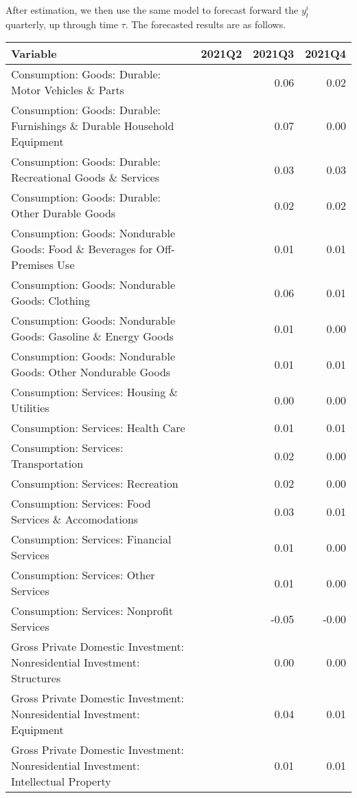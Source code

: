 \documentclass[11pt, letterpaper]{article}\usepackage[]{graphicx}\usepackage[]{color}
\begin{document}
After estimation, we then use the same model to forecast forward the $y^i_t$ quarterly, up through time $\tau$. 
The forecasted results are as follows.
\begin{table}[H]
\centering
\begingroup\scriptsize
\begin{tabular}{lrrr}
  \hline
Variable & 2021Q2 & 2021Q3 & 2021Q4 \\ 
  \hline
Consumption: Goods: Durable: Motor Vehicles \& Parts &  & 0.06 & 0.02 \\ 
  Consumption: Goods: Durable: Furnishings \& Durable Household Equipment &  & 0.07 & 0.00 \\ 
  Consumption: Goods: Durable: Recreational Goods \& Services &  & 0.03 & 0.03 \\ 
  Consumption: Goods: Durable: Other Durable Goods &  & 0.02 & 0.02 \\ 
  Consumption: Goods: Nondurable Goods: Food \& Beverages for Off-Premises Use &  & 0.01 & 0.01 \\ 
  Consumption: Goods: Nondurable Goods: Clothing &  & 0.06 & 0.01 \\ 
  Consumption: Goods: Nondurable Goods: Gasoline \& Energy Goods &  & 0.01 & 0.00 \\ 
  Consumption: Goods: Nondurable Goods: Other Nondurable Goods &  & 0.01 & 0.01 \\ 
  Consumption: Services: Housing \& Utilities &  & 0.00 & 0.00 \\ 
  Consumption: Services: Health Care &  & 0.01 & 0.01 \\ 
  Consumption: Services: Transportation &  & 0.02 & 0.00 \\ 
  Consumption: Services: Recreation &  & 0.02 & 0.00 \\ 
  Consumption: Services: Food Services \& Accomodations &  & 0.03 & 0.01 \\ 
  Consumption: Services: Financial Services &  & 0.01 & 0.00 \\ 
  Consumption: Services: Other Services &  & 0.01 & 0.00 \\ 
  Consumption: Services: Nonprofit Services &  & -0.05 & -0.00 \\ 
  Gross Private Domestic Investment: Nonresidential Investment: Structures &  & 0.00 & 0.00 \\ 
  Gross Private Domestic Investment: Nonresidential Investment: Equipment &  & 0.04 & 0.01 \\ 
  Gross Private Domestic Investment: Nonresidential Investment: Intellectual Property &  & 0.01 & 0.01 \\ 

\end{tabular}
\end{table}
\end{document}
